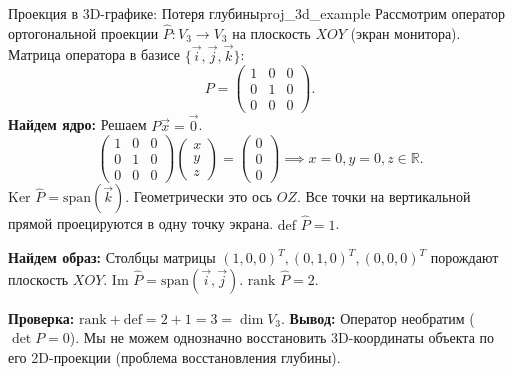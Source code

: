 \documentclass[12pt,a4paper]{article}
\begin{document}
\begin{definition}{Проекция в 3D-графике: Потеря глубины}{proj_3d_example}
  Рассмотрим оператор ортогональной проекции $\hat{P}: V_3 \to V_3$
  на плоскость $XOY$ (экран монитора).
  Матрица оператора в базисе $\{\vec{i}, \vec{j}, \vec{k}\}$:
  \[
    P =
    \begin{pmatrix} 1 & 0 & 0 \\ 0 & 1 & 0 \\ 0 & 0 & 0
    \end{pmatrix}.
  \]
  \textbf{Найдем ядро:} Решаем $P\vec{x} = \vec{0}$.
  \[
    \begin{pmatrix} 1 & 0 & 0 \\ 0 & 1 & 0 \\ 0 & 0 & 0
    \end{pmatrix}
    \begin{pmatrix} x \\ y \\ z
    \end{pmatrix} =
    \begin{pmatrix} 0 \\ 0 \\ 0
    \end{pmatrix} \implies x=0, y=0, z \in \mathbb{R}.
  \]
  $\text{Ker } \hat{P} = \text{span}(\vec{k})$. Геометрически это ось
  $OZ$. Все точки на вертикальной прямой проецируются в одну точку экрана.
  $\text{def } \hat{P} = 1$.

  \textbf{Найдем образ:} Столбцы матрицы $(1,0,0)^T, (0,1,0)^T,
  (0,0,0)^T$ порождают плоскость $XOY$.
  $\text{Im } \hat{P} = \text{span}(\vec{i}, \vec{j})$.
  $\text{rank } \hat{P} = 2$.

  \textbf{Проверка:} $\text{rank} + \text{def} = 2 + 1 = 3 = \dim V_3$.
  \textbf{Вывод:} Оператор необратим ($\det P = 0$). Мы не можем
  однозначно восстановить 3D-координаты объекта по его 2D-проекции
  (проблема восстановления глубины).
\end{definition}
\end{document}
